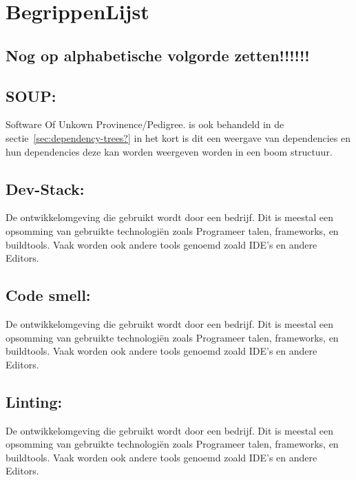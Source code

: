 
\chapter{BegrippenLijst}\label{ch:begrippenlijst}





\section*{Nog op alphabetische volgorde zetten!!!!!!}\label{sec:nog-op-alphabetische-volgorde-zetten!!!!!!}


\section{SOUP:}\label{sec:soup:} Software Of Unkown Provinence/Pedigree. is ook behandeld in de sectie~\ref{sec:dependency-trees?} in het kort is dit een weergave van dependencies en hun dependencies deze kan worden weergeven worden in een boom structuur.
\smallskip

\section{Dev-Stack:}\label{sec:dev-stack:} De ontwikkelomgeving die gebruikt wordt door een bedrijf. Dit is meestal een opsomming van gebruikte technologiën zoals Programeer talen, frameworks, en buildtools. Vaak worden ook andere tools genoemd zoald IDE's en andere Editors.
\smallskip

\section{Code smell:}\label{sec:code-smell:} De ontwikkelomgeving die gebruikt wordt door een bedrijf. Dit is meestal een opsomming van gebruikte technologiën zoals Programeer talen, frameworks, en buildtools. Vaak worden ook andere tools genoemd zoald IDE's en andere Editors.
\smallskip

\section{Linting:}\label{sec:linting:} De ontwikkelomgeving die gebruikt wordt door een bedrijf. Dit is meestal een opsomming van gebruikte technologiën zoals Programeer talen, frameworks, en buildtools. Vaak worden ook andere tools genoemd zoald IDE's en andere Editors.
\smallskip




